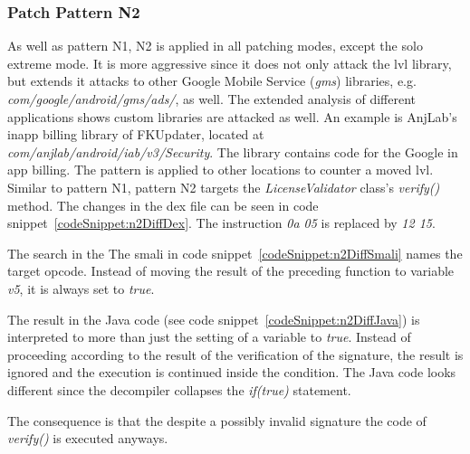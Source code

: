 \subsubsection{Patch Pattern N2}
As well as pattern N1, N2 is applied in all patching modes, except the solo extreme mode.
It is more aggressive since it does not only attack the \gls{lvl} library, but extends it attacks to other Google Mobile Service (\textit{gms}) libraries, e.g.  \textit{com/google/android/gms/ads/}, as well.
The extended analysis of different applications shows custom libraries are attacked as well.
An example is AnjLab's inapp billing library \cite{inappBilling} of FKUpdater, located at \textit{com/anjlab/android/iab/v3/Security}.
The library contains code for the Google in app billing.
The pattern is applied to other locations to counter a moved \gls{lvl}.
Similar to pattern N1, pattern N2 targets the \textit{LicenseValidator} class's \textit{verify()} method.
\newline
The changes in the \gls{dex} file can be seen in code snippet~\ref{codeSnippet:n2DiffDex}.
The instruction \textit{0a 05} is replaced by \textit{12 15}.
\newline


The search in the
\newline
The smali in code snippet~\ref{codeSnippet:n2DiffSmali} names the target opcode.
Instead of moving the result of the preceding function to variable \textit{v5}, it is always set to \textit{true}.
\newline

The result in the Java code (see code snippet~\ref{codeSnippet:n2DiffJava}) is interpreted to more than just the setting of a variable to \textit{true}.
Instead of proceeding according to the result of the verification of the signature, the result is ignored and the execution is continued inside the condition.
The Java code looks different since the decompiler collapses the \textit{if(true)} statement.
\newline

The consequence is that the despite a possibly invalid signature the code of \textit{verify()} is executed anyways.

